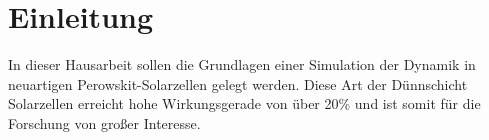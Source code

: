 \chapter{Einleitung}
In dieser Hausarbeit sollen die Grundlagen einer Simulation der Dynamik in neuartigen Perowskit-Solarzellen gelegt werden. Diese Art der Dünnschicht Solarzellen erreicht hohe Wirkungsgerade von über  20\% und ist somit für die Forschung von großer Interesse\cite{Prof.Dr.AndreasZeiser.April2021}.  


